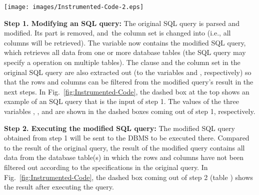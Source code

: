 

\begin{figure*}[tbp]
  \centering
  \texttt{[image: images/Instrumented-Code-2.eps]}\\
  \caption{Instrumented code to monitor the execution of SQL queries}\label{fig:Instrumented-Code}
\end{figure*}


\textbf{Step 1. Modifying an SQL query:}
The original SQL query is parsed and modified. Its
 part is removed, and~the column set is changed into 
(i.e., all columns will be retrieved). The  variable
now contains the modified SQL query, which retrieves all data from one
or more database tables (the SQL query may specify a 
operation on multiple tables). The  clause and the column
set in the original SQL query are also extracted out (to the variables
 and , respectively) so that the
rows and columns can be filtered from the modified query's result in
the next steps. In Fig.~\ref{fig:Instrumented-Code}, the dashed box
at the top shows an example of an SQL query that is the input of step
1. The values of the three variables ,
, and  are shown in the dashed boxes
coming out of step 1, respectively.


\vspace{0.04in}
\textbf{Step 2. Executing the modified SQL query:}
The modified SQL query obtained from step 1 will be sent to the DBMS
to be executed there. Compared to the result of the original query,
the result of the modified query contains all data from the database
table(s) in which the rows and columns have not been filtered out
according to the specifications in the original query. In
Fig.~\ref{fig:Instrumented-Code}, the dashed box coming out of step
2 (table ) shows the result after executing the
 query.

